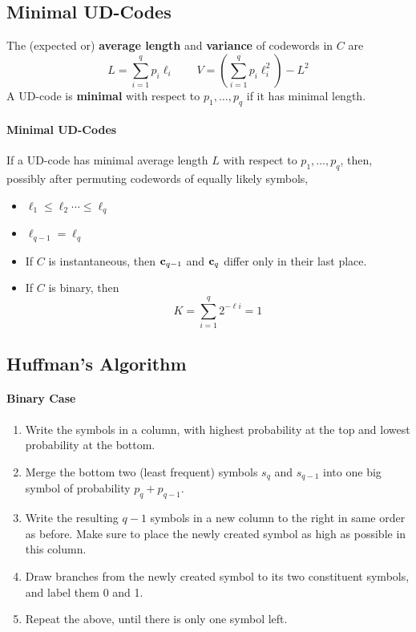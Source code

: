 \subsection{Minimal UD-Codes}
The (expected or) \textbf{average length} and \textbf{variance} of codewords in \(C\) are
\[L = \sum_{i=1}^q p_i \ell_i \quad \quad V = (\sum_{i=1}^{q}p_i \ell_i^2) - L^2\]
A UD-code is \textbf{minimal} with respect to \(p_1, \dots, p_q\) if it has minimal length.

\paragraph{Minimal UD-Codes}
If a UD-code has minimal average length \(L\) with respect to \(p_1, \dots, p_q\), then, possibly after permuting codewords of equally likely symbols,
\begin{itemize}
    \item \(\ell_1 \leq \ell_2 \cdots \leq \ell_q\)
    \item \(\ell_{q - 1} = \ell_q\)
    \item If \(C\) is instantaneous, then \(\mathbf{c}_{q - 1}\) and \(\mathbf{c}_q\) differ only in their last place.
    \item If \(C\) is binary, then
          \[K = \sum_{i=1}^{q}2^{-\ell i} = 1\]
\end{itemize}

\subsection{Huffman's Algorithm}
\paragraph{Binary Case}
\begin{enumerate}
    \item Write the symbols in a column, with highest probability at the top and lowest probability at the bottom.
    \item Merge the bottom two (least frequent) symbols \(s_q\) and \(s_{q - 1}\) into one big symbol of probability \(p_q + p_{q - 1}\).
    \item Write the resulting \(q - 1\) symbols in a new column to the right in same order as before. Make sure to place the newly created symbol as high as possible in this column.
    \item Draw branches from the newly created symbol to its two constituent symbols, and label them 0 and 1.
    \item Repeat the above, until there is only one symbol left.
\end{enumerate}

